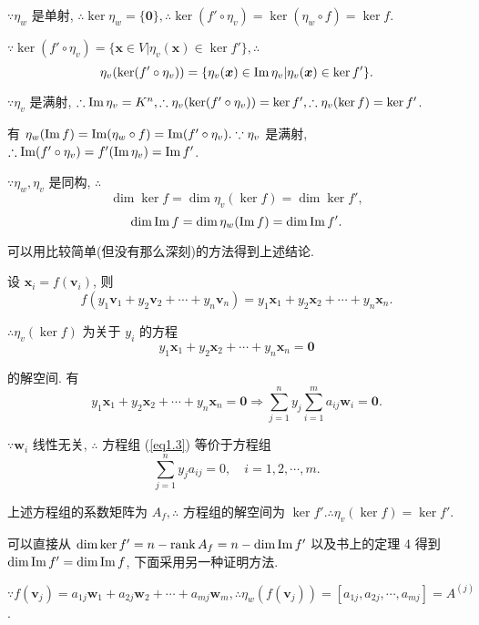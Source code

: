 \documentclass[color=black,device=normal,lang=cn,mode=geye]{elegantnote}
\begin{document}
$\because\eta_w$ 是单射, $\therefore\ker\eta_w=\{\boldsymbol{0}\},\therefore\ker(f'\circ\eta_v)=\ker(\eta_w\circ f)=\ker f$.

$\because\ker(f'\circ\eta_v)=\{\boldsymbol{x}\in V|\eta_v(\boldsymbol{x})\in\ker f'\},\therefore$
\[\eta_v(\ker(f'\circ\eta_v))=\{\eta_v(\boldsymbol{x})\in\operatorname{Im} \eta_v|\eta_v(\boldsymbol{x})\in\ker f'\}.\]

$\because\eta_v$ 是满射, $\therefore\operatorname{Im} \eta_v=K^n,\therefore\eta_v(\ker(f'\circ\eta_v))=\ker f',\therefore\eta_v(\ker f)=\ker f'$.

有 $\eta_w(\operatorname{Im} f)=\operatorname{Im} (\eta_w\circ f)=\operatorname{Im} (f'\circ\eta_v).\because\eta_v$ 是满射, $\therefore\operatorname{Im} (f'\circ\eta_v)=f'(\operatorname{Im} \eta_v)=\operatorname{Im} f'$.

$\because\eta_w,\eta_v$ 是同构, $\therefore$
\[\dim\ker f=\dim\eta_v(\ker f)=\dim\ker f',\]
\begin{equation}\label{eq1.2}
    \dim\operatorname{Im} f=\dim\eta_w(\operatorname{Im} f)=\dim\operatorname{Im} f'.
\end{equation}

可以用比较简单(但没有那么深刻)的方法得到上述结论.

设 $\boldsymbol{x}_i=f(\boldsymbol{v}_i)$, 则
\[f(y_1\boldsymbol{v}_1+y_2\boldsymbol{v}_2+\cdots+y_n\boldsymbol{v}_n)=y_1\boldsymbol{x}_1+y_2\boldsymbol{x}_2+\cdots+y_n\boldsymbol{x}_n.\]

$\therefore\eta_v(\ker f)$ 为关于 $y_i$ 的方程
\begin{equation}\label{eq1.3}
    y_1\boldsymbol{x}_1+y_2\boldsymbol{x}_2+\cdots+y_n\boldsymbol{x}_n=\boldsymbol{0}
\end{equation}

的解空间. 有
\[y_1\boldsymbol{x}_1+y_2\boldsymbol{x}_2+\cdots+y_n\boldsymbol{x}_n=\boldsymbol{0}\Rightarrow\sum\limits_{j=1}^ny_j\sum\limits_{i=1}^ma_{ij}\boldsymbol{w}_i=\boldsymbol{0}.\]

$\because\boldsymbol{w}_i$ 线性无关, $\therefore$ 方程组 (\ref{eq1.3}) 等价于方程组
\[\sum\limits_{j=1}^ny_ja_{ij}=0,\quad i=1,2,\cdots,m.\]

上述方程组的系数矩阵为 $A_f,\therefore$ 方程组的解空间为 $\ker f'.\therefore\eta_v(\ker f)=\ker f'$.

可以直接从 $\dim\ker f'=n-\operatorname{rank} A_f=n-\dim\operatorname{Im} f'$ 以及书上的定理 4 得到 $\dim\operatorname{Im} f'=\dim\operatorname{Im} f$, 下面采用另一种证明方法.

$\because f(\boldsymbol{v}_j)=a_{1j}\boldsymbol{w}_1+a_{2j}\boldsymbol{w}_2+\cdots+a_{mj}\boldsymbol{w}_m,\therefore\eta_w(f(\boldsymbol{v}_j))=[a_{1j},a_{2j},\cdots,a_{mj}]=A^{(j)}$.
\end{document}
